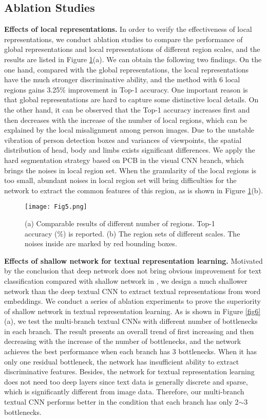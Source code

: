 \documentclass[review]{elsarticle}
\begin{document}
\subsection{Ablation Studies}
\textbf{Effects of local representations.} In order to verify the effectiveness of local representations, we conduct ablation studies to compare the performance of global representations and local representations of different region scales, and the results are listed in Figure \ref{fig5}(a). We can obtain the following two findings. On the one hand, compared with the global representations, the local representations have the much stronger discriminative ability, and the method with 6 local regions gains 3.25\% improvement in Top-1 accuracy. One important reason is that global representations are hard to capture some distinctive local details. On the other hand, it can be observed that the Top-1 accuracy increases first and then decreases with the increase of the number of local regions, which can be explained by the local misalignment among person images. Due to the unstable vibration of person detection boxes and variances of viewpoints, the spatial distribution of head, body and limbs exists significant differences. We apply the hard segmentation strategy based on PCB \cite{2} in the visual CNN branch, which brings the noises in local region set. When the granularity of the local regions is too small, abundant noises in local region set will bring difficulties for the network to extract the common features of this region, as is shown in Figure \ref{fig5}(b).

\begin{figure}[!t]
\centering
\texttt{[image: Fig5.png]}\\
\caption{(a) Comparable results of different number of regions. Top-1 accuracy (\%) is reported. (b) The region sets of different scales. The noises inside are marked by red bounding boxes.}
\label{fig5}
\end{figure}


\textbf{Effects of shallow network for textual representation learning.} Motivated by the conclusion that deep network does not bring obvious improvement for text classification compared with shallow network in \cite{50}, we design a much shallower network than the deep textual CNN \cite{12} to extract textual representations from word embeddings. We conduct a series of ablation experiments to prove the superiority of shallow network in textual representation learning. As is shown in Figure \ref{fig6}(a), we test the multi-branch textual CNNs with different number of bottlenecks in each branch. The result presents an overall trend of first increasing and then decreasing with the increase of the number of bottlenecks, and the network achieves the best performance when each branch has 3 bottlenecks. When it has only one residual bottleneck, the network has insufficient ability to extract discriminative features. Besides, the network for textual representation learning does not need too deep layers since text data is generally discrete and sparse, which is significantly different from image data. Therefore, our multi-branch textual CNN performs better in the condition that each branch has only 2$\sim$3 bottlenecks.
\end{document}
